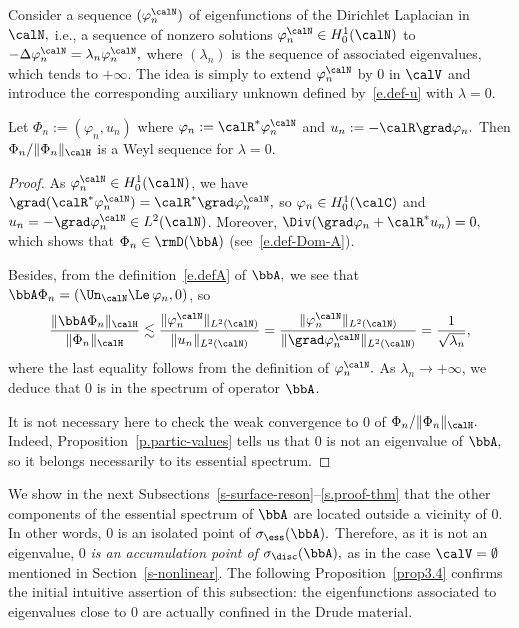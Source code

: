 Consider a sequence $(\varphi_n^\calN)$ of eigenfunctions of the Dirichlet Laplacian in $\calN,$ i.e., a sequence of nonzero solutions $\varphi_n^\calN \in H^1_0(\calN)$ to $-\Delta \varphi_n^\calN = \lambda_n \varphi_n^\calN,$ where $(\lambda_n)$ is the sequence of associated eigenvalues, which tends to $+\infty.$ The idea is simply to extend $\varphi_n^\calN$ by 0 in $\calV$ and introduce the corresponding auxiliary unknown defined by~\eqref{e.def-u} with $\lambda=0.$
\pagebreak


\begin{prop}\label{p-Weyl-bulk}
Let $\Phi_n := (\varphi_n,u_n)$ where $\varphi_n := \calR^* \varphi_n^\calN$ and $u_n :=\linebreak- \calR \grad \varphi_n.$ Then $\Phi_n/\|\Phi_n\|_\calH$ is a Weyl sequence for $\lambda = 0.$
\end{prop}


\begin{proof}
As $\varphi_n^\calN \in H_0^1(\calN)$, we have $\grad (\calR^* \varphi_n^\calN) = \calR^* \grad \varphi_n^\calN,$ so $\varphi_n \in H_0^1(\calC)$ and $u_n = - \grad \varphi_n^\calN \in L^2(\calN)$. Moreover, $\Div (\grad \varphi_n + \calR^* u_n) = 0,$ which shows that $\Phi_n \in \rmD(\bbA)$ (see~\eqref{e.def-Dom-A}).

Besides, from the definition~\eqref{e.defA} of $\bbA,$ we see that $\bbA \Phi_n = (\Un_\calN \Le \, \varphi_n,0)$, so
\[
\frac{\| \bbA \Phi_n \|_\calH}{\| \Phi_n \|_\calH}
\lesssim \frac{ \| \varphi_n^\calN \|_{L^2(\calN)} }{\| u_n \|_{L^2(\calN)}} = \frac{ \| \varphi_n^\calN \|_{L^2(\calN)} }{\| \grad \varphi_n^\calN \|_{L^2(\calN)}} = \frac{1}{\sqrt{\lambda_n}},
\]
where the last equality follows from the definition of $\varphi_n^\calN.$ As $\lambda_n \to +\infty$, we deduce that $0$ is in the spectrum of operator $\bbA$.

It is not necessary here to check the weak convergence to 0 of $\Phi_n/\|\Phi_n\|_\calH.$ Indeed, Proposition~\ref{p.partic-values} tells us that $0$ is not an eigenvalue of $\bbA,$ so it belongs necessarily to its essential spectrum.
\end{proof}

We show in the next Subsections~\ref{s-surface-reson}--\ref{s.proof-thm} that the other components of the essential spectrum of $\bbA$ are located outside a vicinity of $0.$ In other words, $0$ is an isolated point of $\sigma_{\ess}(\bbA).$ Therefore, as it is not an eigenvalue, $0$ \emph{is an accumulation point of} $\sigma_{\disc}(\bbA),$ as in the case $\calV = \emptyset$ mentioned in Section~\ref{s-nonlinear}. The following Proposition~\ref{prop3.4} confirms the initial intuitive assertion of this subsection: the eigenfunctions associated to eigenvalues close to 0 are actually confined in the Drude material.

